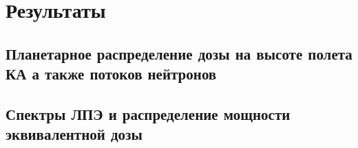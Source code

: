 
\chapter{Результаты}\label{chapt_results}


\section{Планетарное распределение дозы на высоте полета КА а также потоков нейтронов}

\section{Спектры ЛПЭ и распределение мощности эквивалентной дозы}
